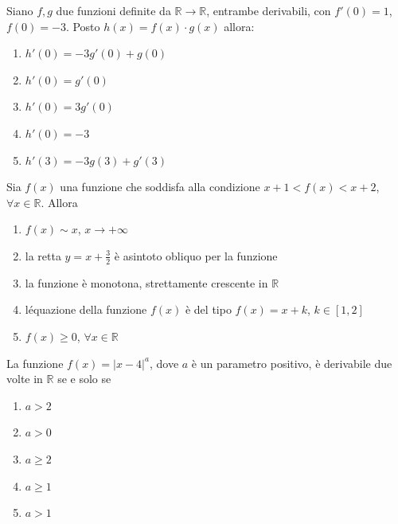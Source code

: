 \begin{quiz}
Siano $f,g$ due funzioni definite da $\mathbb R\to\mathbb R$, entrambe derivabili, con $f\prime(0)=1$, $f(0)=-3$. Posto $h(x)=f(x)\cdot g(x)$ allora:
\begin{enumerate}
\item $h\prime(0)=-3g\prime(0)+g(0)$
\item $h\prime(0)=g\prime(0)$
\item $h\prime(0)=3g\prime(0)$
\item $h\prime(0)=-3$
\item $h\prime(3)=-3g(3)+g\prime(3)$
\end{enumerate}
\end{quiz}

\begin{quiz}
Sia $f(x)$ una funzione che soddisfa alla condizione $x+1<f(x)<x+2$, $\forall x\in\mathbb R$. Allora
\begin{enumerate}
\item $f(x)\sim x$, $x\to+\infty$
\item la retta $y=x+\frac32$ \`e asintoto obliquo per la funzione
\item la funzione \`e monotona, strettamente crescente in $\mathbb R$
\item l\'equazione della funzione $f(x)$ \`e del tipo $f(x)=x+k$, $k\in[1,2]$
\item $f(x)\geq0$, $\forall x\in\mathbb R$
\end{enumerate}
\end{quiz}

\begin{quiz}
La funzione $f(x)=|x-4|^a$, dove $a$ \`e un parametro positivo, \`e derivabile due volte in $\mathbb R$ se e solo se
\begin{enumerate}
\item $a>2$
\item $a>0$
\item $a\geq2$
\item $a\geq1$
\item $a>1$
\end{enumerate}
\end{quiz}

